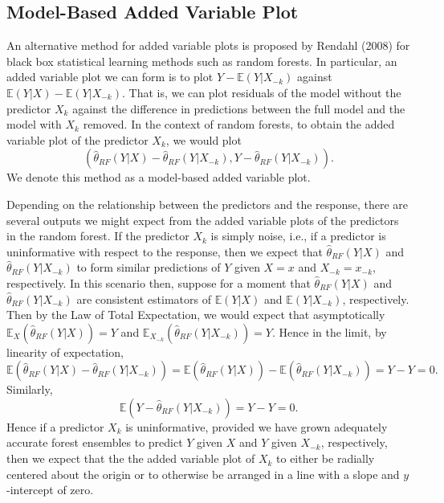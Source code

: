 \documentclass[12pt,twoside]{reedthesis}
\theoremstyle{definition}
\theoremstyle{definition}
\theoremstyle{definition}
\theoremstyle{remark}
\begin{document}
\subsection{Model-Based Added Variable
Plot}\label{model-based-added-variable-plot}

An alternative method for added variable plots is proposed by Rendahl
(2008) for black box statistical learning methods such as random
forests. In particular, an added variable plot we can form is to plot
\(Y-\mathbb{E}(Y|X_{-k})\) against
\(\mathbb{E}(Y|X)-\mathbb{E}(Y|X_{-k})\). That is, we can plot residuals
of the model without the predictor \(X_k\) against the difference in
predictions between the full model and the model with \(X_k\) removed.
In the context of random forests, to obtain the added variable plot of
the predictor \(X_k\), we would plot
\[(\hat{\theta}_{RF}(Y|X)-\hat{\theta}_{RF}(Y|X_{-k}), Y-\hat{\theta}_{RF}(Y|X_{-k})).\]
We denote this method as a model-based added variable plot. \par

Depending on the relationship between the predictors and the response,
there are several outputs we might expect from the added variable plots
of the predictors in the random forest. If the predictor \(X_k\) is
simply noise, i.e., if a predictor is uninformative with respect to the
response, then we expect that \(\hat{\theta}_{RF}(Y|X)\) and
\(\hat{\theta}_{RF}(Y|X_{-k})\) to form similar predictions of \(Y\)
given \(X=x\) and \(X_{-k}=x_{-k}\), respectively. In this scenario
then, suppose for a moment that \(\hat{\theta}_{RF}(Y|X)\) and
\(\hat{\theta}_{RF}(Y|X_{-k})\) are consistent estimators of
\(\mathbb{E}(Y|X)\) and \(\mathbb{E}(Y|X_{-k})\), respectively. Then by
the Law of Total Expectation, we would expect that asymptotically
\(\mathbb{E}_X(\hat{\theta}_{RF}(Y|X))=Y\) and
\(\mathbb{E}_{X_{-k}}(\hat{\theta}_{RF}(Y|X_{-k}))=Y\). Hence in the
limit, by linearity of expectation,
\[\mathbb{E}(\hat{\theta}_{RF}(Y|X)-\hat{\theta}_{RF}(Y|X_{-k}))=\mathbb{E}(\hat{\theta}_{RF}(Y|X))-\mathbb{E}(\hat{\theta}_{RF}(Y|X_{-k}))=Y-Y=0.\]
Similarly, \[\mathbb{E}(Y-\hat{\theta}_{RF}(Y|X_{-k}))=Y-Y=0.\] Hence if
a predictor \(X_k\) is uninformative, provided we have grown adequately
accurate forest ensembles to predict \(Y\) given \(X\) and \(Y\) given
\(X_{-k}\), respectively, then we expect that the the added variable
plot of \(X_k\) to either be radially centered about the origin or to
otherwise be arranged in a line with a slope and \(y\)-intercept of
zero. \par
\end{document}
